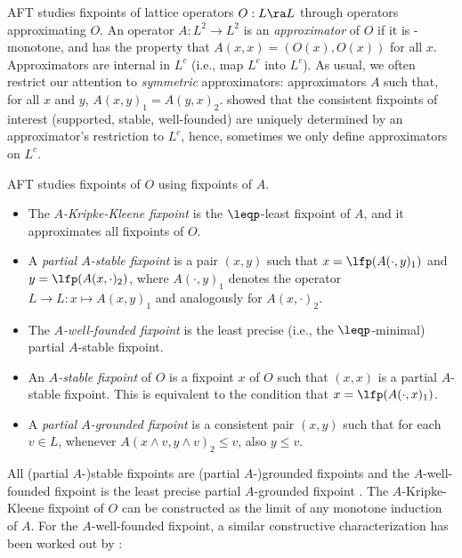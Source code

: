 

AFT studies fixpoints of lattice operators $O:L\ra L$ through operators approximating $O$.
 An operator $A: L^2\to L^2$  is an \emph{approximator} of $O$ if it is \leqp-monotone,  and has the property that $A(x,x) = (O(x),O(x))$ for all $x$. %
Approximators are internal in $L^c$ (i.e., map $L^c$ into $L^c$).
As usual, we often restrict our attention to \emph{symmetric} approximators: approximators $A$ such that, for all $x$ and $y$, $A(x,y)_1 = A(y,x)_2$.
\citet{DeneckerMT04} showed that the consistent fixpoints of interest (supported, stable, well-founded) are uniquely determined by an approximator's restriction to $L^c$, hence, sometimes we only define approximators on $L^c$. 

AFT studies fixpoints of $O$ using fixpoints of $A$. 
 \begin{itemize}
  \item The \emph{$A$-Kripke-Kleene fixpoint} is the $\leqp$-least fixpoint of $A$, and it approximates all fixpoints of $O$. 
\item A \emph{partial $A$-stable fixpoint} is a pair  $(x,y)$ such that $x=\lfp(A(\cdot,y)_1)$ and $y=\lfp(A(x,\cdot)_2)$, where $A(\cdot,y)_1$ denotes the operator $L\to L:x\mapsto A(x,y)_1$ and analogously for $A(x,\cdot)_2$. 
\item The \emph{$A$-well-founded fixpoint} is the least precise (i.e., the $\leqp$-minimal) partial $A$-stable fixpoint.
\item  An \emph{$A$-stable fixpoint} of $O$ is a fixpoint $x$ of $O$ such that $(x,x)$ is a partial $A$-stable fixpoint. This is equivalent to the condition that $x=\lfp(A(\cdot, x)_1)$.
\item A \emph{partial $A$-grounded fixpoint} is a consistent pair $(x,y)$ such that for each $v\in L$, whenever $A(x\land v, y\land v)_2 \leq v$, also $y\leq v$. 
 \end{itemize}
 
 All (partial $A$-)stable fixpoints are (partial $A$-)grounded fixpoints and the $A$-well-founded fixpoint is the least precise partial $A$-grounded fixpoint . 
The $A$-Kripke-Kleene fixpoint of $O$ can be constructed as the limit of any monotone induction of $A$. 
For the $A$-well-founded fixpoint, a similar constructive characterization has been worked out by \citet{lpnmr/DeneckerV07}:

